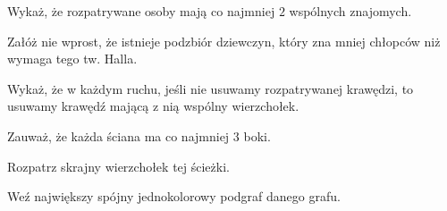 
\begin{hints_list}
	\item Wykaż, że rozpatrywane osoby mają co najmniej $2$ wspólnych znajomych.
	\item Załóż nie wprost, że istnieje podzbiór dziewczyn, który zna mniej chłopców niż wymaga tego tw. Halla.
	\item Wykaż, że w każdym ruchu, jeśli nie usuwamy rozpatrywanej krawędzi, to usuwamy krawędź mającą z nią wspólny wierzchołek.
	\item Zauważ, że każda ściana ma co najmniej $3$ boki.
	\item Rozpatrz skrajny wierzchołek tej ścieżki.
	\item Weź największy spójny jednokolorowy podgraf danego grafu.
\end{hints_list}